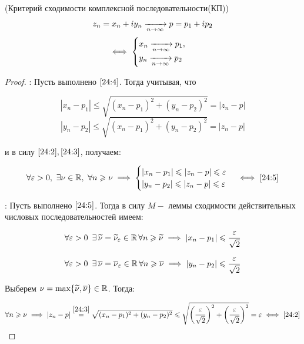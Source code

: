 \documentclass[../../main.tex]{subfiles}
\begin{document}
\begin{thm}(Критерий сходимости комплексной последовательности(КП))
	\begin{equation}\label{24:4}
		z_n = x_n + i y_n \appr{n \rightarrow \infty} p = p_1 + i p_2
	\end{equation}
	\begin{equation}\label{24:5}
		\iff
		\begin{cases}
			x_n \appr{n \rightarrow \infty} p_1, \\
			y_n \appr{n \rightarrow \infty} p_2
		\end{cases}\,
	\end{equation}
\end{thm}
\begin{proof}
\;

	\nec: Пусть выполнено $ \eqref{24:4} $. Тогда учитывая, что
	
	\[|x_n - p_1| \leq \sqrt{(x_n - p_1)^2 + (y_n - p_2)^2} = |z_n - p|\]
	\[|y_n - p_2| \leq \sqrt{(x_n - p_1)^2 + (y_n - p_2)^2} = |z_n - p|\]
	
	и в силу $ \eqref{24:2}, \eqref{24:3} $, получаем:
	
	\[\forall \varepsilon > 0,\ \exists \nu \in \R,\ \forall n \geq \nu \implies \begin{cases}
		|x_n - p_1| \leq |z_n - p| \leq \varepsilon \\
		|y_n - p_2| \leq |z_n - p| \leq \varepsilon \\
	\end{cases} \iff \eqref{24:5} \]
	
	\suff: Пусть выполнено $ \eqref{24:5} $. Тогда в силу $ M- $ леммы сходимости действительных числовых последовательностей имеем:
	
	\[\forall \varepsilon > 0\,\ \exists\, \widetilde{\nu} = \widetilde{\nu}_\varepsilon \in \R\, \forall n \geq \widetilde{\nu} \implies 
	|x_n - p_1| \leq \frac{\varepsilon}{\sqrt{2}}\]
	
	\[\forall \varepsilon > 0\,\ \exists\, \overline{\nu} = \overline{\nu}_\varepsilon \in \R\, \forall n \geq \overline{\nu} \implies 
	|y_n - p_2| \leq \frac{\varepsilon}{\sqrt{2}} \]
	
	Выберем $ \nu = \max\{\widetilde{\nu}, \overline{\nu}\} \in \R $. Тогда:
	
	\[\forall n \geq \nu \implies 
	|z_n - p| \stackrel{\eqref{24:3}}{=} \sqrt{(x_n - p_1)^2 + (y_n - p_2)^2} \leq \sqrt{\left(\frac{\varepsilon}{\sqrt{2}}\right)^2 + \left(\frac{\varepsilon}{\sqrt{2}}\right)^2} = \varepsilon \iff \eqref{24:2} \]
\end{proof}
\end{document}
